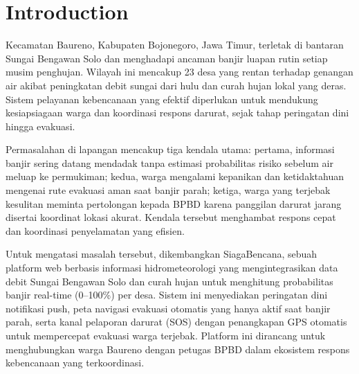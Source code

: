 \section{Introduction}

Kecamatan Baureno, Kabupaten Bojonegoro, Jawa Timur, terletak di bantaran Sungai Bengawan Solo dan menghadapi ancaman banjir luapan rutin setiap musim penghujan. Wilayah ini mencakup 23 desa yang rentan terhadap genangan air akibat peningkatan debit sungai dari hulu dan curah hujan lokal yang deras. Sistem pelayanan kebencanaan yang efektif diperlukan untuk mendukung kesiapsiagaan warga dan koordinasi respons darurat, sejak tahap peringatan dini hingga evakuasi.

Permasalahan di lapangan mencakup tiga kendala utama: pertama, informasi banjir sering datang mendadak tanpa estimasi probabilitas risiko sebelum air meluap ke permukiman; kedua, warga mengalami kepanikan dan ketidaktahuan mengenai rute evakuasi aman saat banjir parah; ketiga, warga yang terjebak kesulitan meminta pertolongan kepada BPBD karena panggilan darurat jarang disertai koordinat lokasi akurat. Kendala tersebut menghambat respons cepat dan koordinasi penyelamatan yang efisien.

Untuk mengatasi masalah tersebut, dikembangkan SiagaBencana, sebuah platform web berbasis informasi hidrometeorologi yang mengintegrasikan data debit Sungai Bengawan Solo dan curah hujan untuk menghitung probabilitas banjir real-time (0--100\%) per desa. Sistem ini menyediakan peringatan dini notifikasi push, peta navigasi evakuasi otomatis yang hanya aktif saat banjir parah, serta kanal pelaporan darurat (SOS) dengan penangkapan GPS otomatis untuk mempercepat evakuasi warga terjebak. Platform ini dirancang untuk menghubungkan warga Baureno dengan petugas BPBD dalam ekosistem respons kebencanaan yang terkoordinasi.
